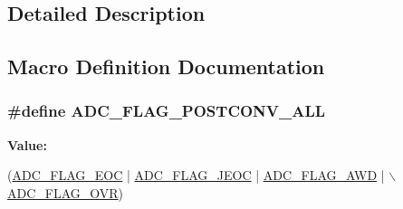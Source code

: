 \subsection{Detailed Description}


\subsection{Macro Definition Documentation}
\hypertarget{group___a_d_c___private___constants_ga790f33c46bdd17e04ec3421d98a73504}{
\subsubsection[{A\-D\-C\-\_\-\-F\-L\-A\-G\-\_\-\-P\-O\-S\-T\-C\-O\-N\-V\-\_\-\-A\-L\-L}]{\setlength{\rightskip}{0pt plus 5cm}\#define A\-D\-C\-\_\-\-F\-L\-A\-G\-\_\-\-P\-O\-S\-T\-C\-O\-N\-V\-\_\-\-A\-L\-L}}\label{group___a_d_c___private___constants_ga790f33c46bdd17e04ec3421d98a73504}
{\bfseries Value\-:}
\begin{DoxyCode}
(\hyperlink{group___a_d_c__flags__definition_gaf2c6fdf7e9ab63b778149e5fb56413d4}{ADC\_FLAG\_EOC} | \hyperlink{group___a_d_c__flags__definition_ga4df8eea8ab83d98104ee15a339743a4e}{ADC\_FLAG\_JEOC} | \hyperlink{group___a_d_c__flags__definition_gadb75a4b430fb84950232b7a8f3a6a877}{ADC\_FLAG\_AWD} | 
      \hyperlink{group___a_d_c__flags__definition_ga6e8f399d2af342bd18b9f5803cb986e7}{\(\backslash\)}
\hyperlink{group___a_d_c__flags__definition_ga6e8f399d2af342bd18b9f5803cb986e7}{                                 ADC\_FLAG\_OVR})
\end{DoxyCode}
